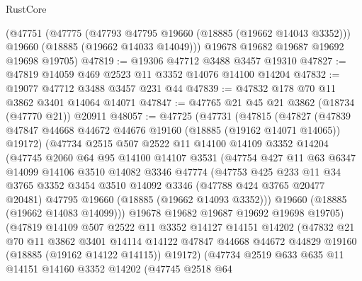 \begin{lexlean}{RustCore}
\begin{coremodule}
    (@47751
      (@47775
        (@47793 @47795 @19660 (@18885 (@19662 @14043 @3352)))
        @19660
        (@18885 (@19662 @14033 @14049)))
      @19678
      @19682
      @19687
      @19692
      @19698
      @19705)
@47819 := @19306 @47712 @3488 @3457 @19310
@47827 := @47819 @14059 @469 @2523 @11 @3352 @14076 @14100 @14204
@47832 := @19077 @47712 @3488 @3457 @231 @44
@47839 := @47832 @178 @70 @11 @3862 @3401 @14064 @14071
@47847 := @47765 @21 @45 @21 @3862 (@18734 (@47770 @21)) @20911
@48057 := @47725
    (@47731
      (@47815
        (@47827
          (@47839 @47847 @44668 @44672 @44676 @19160 (@18885 (@19162 @14071 @14065)) @19172)
          (@47734
            @2515
            @507
            @2522
            @11
            @14100
            @14109
            @3352
            @14204
            (@47745
              @2060
              @64
              @95
              @14100
              @14107
              @3531
              (@47754
                @427
                @11
                @63
                @6347
                @14099
                @14106
                @3510
                @14082
                @3346
                @47774
                (@47753
                  @425
                  @233
                  @11
                  @34
                  @3765
                  @3352
                  @3454
                  @3510
                  @14092
                  @3346
                  (@47788 @424 @3765 @20477 @20481)
                  @47795
                  @19660
                  (@18885 (@19662 @14093 @3352)))
                @19660
                (@18885 (@19662 @14083 @14099)))
              @19678
              @19682
              @19687
              @19692
              @19698
              @19705)
            (@47819
              @14109
              @507
              @2522
              @11
              @3352
              @14127
              @14151
              @14202
              (@47832
                @21
                @70
                @11
                @3862
                @3401
                @14114
                @14122
                @47847
                @44668
                @44672
                @44829
                @19160
                (@18885 (@19162 @14122 @14115))
                @19172)
              (@47734
                @2519
                @633
                @635
                @11
                @14151
                @14160
                @3352
                @14202
                (@47745
                  @2518
                  @64

\end{coremodule}
\end{lexlean}
